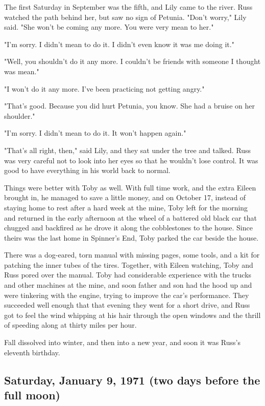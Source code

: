 The first Saturday in September was the fifth, and Lily came to the river. Russ watched the path behind her, but saw no sign of Petunia. "Don't worry," Lily said. "She won't be coming any more. You were very mean to her."

"I'm sorry. I didn't mean to do it. I didn't even know it was me doing it."

"Well, you shouldn't do it any more. I couldn't be friends with someone I thought was mean."

"I won't do it any more. I've been practicing not getting angry."

"That's good. Because you did hurt Petunia, you know. She had a bruise on her shoulder."

"I'm sorry. I didn't mean to do it. It won't happen again."

"That's all right, then," said Lily, and they sat under the tree and talked. Russ was very careful not to look into her eyes so that he wouldn't lose control. It was good to have everything in his world back to normal.

Things were better with Toby as well. With full time work, and the extra Eileen brought in, he managed to save a little money, and on October 17, instead of staying home to rest after a hard week at the mine, Toby left for the morning and returned in the early afternoon at the wheel of a battered old black car that chugged and backfired as he drove it along the cobblestones to the house. Since theirs was the last home in Spinner's End, Toby parked the car beside the house.

There was a dog-eared, torn manual with missing pages, some tools, and a kit for patching the inner tubes of the tires. Together, with Eileen watching, Toby and Russ pored over the manual. Toby had considerable experience with the trucks and other machines at the mine, and soon father and son had the hood up and were tinkering with the engine, trying to improve the car's performance. They succeeded well enough that that evening they went for a short drive, and Russ got to feel the wind whipping at his hair through the open windows and the thrill of speeding along at thirty miles per hour.

Fall dissolved into winter, and then into a new year, and soon it was Russ's eleventh birthday.

\subsection{Saturday, January 9, 1971 (two days before the full moon)}

